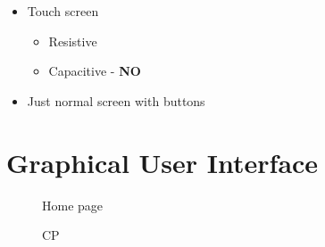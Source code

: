 \documentclass[letterpaper]{article}
\begin{document}
\begin{itemize}
   \item Touch screen
      \begin{itemize}
         \item Resistive
         \item Capacitive - \textbf{NO}
      \end{itemize}
   \item Just normal screen with buttons
\end{itemize}

\section{Graphical User Interface}

\begin{figure}[!htb]
\centering
\begin{minipage}{.49\textwidth}
\centering

\caption{Home page}
\end{minipage} \hfill
\begin{minipage}{.49\textwidth}
\centering

\caption{CP}
\end{minipage}
\end{figure}
\end{document}
